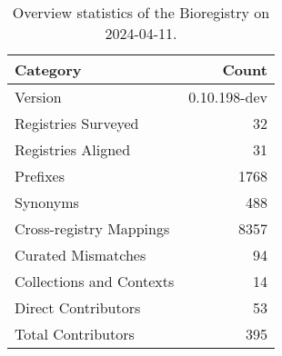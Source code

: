 \begin{table}
\caption{Overview statistics of the Bioregistry on 2024-04-11.}
\label{tab:bioregistry-summary}
\begin{tabular}{lr}
\toprule
Category & Count \\
\midrule
Version & 0.10.198-dev \\
Registries Surveyed & 32 \\
Registries Aligned & 31 \\
Prefixes & 1768 \\
Synonyms & 488 \\
Cross-registry Mappings & 8357 \\
Curated Mismatches & 94 \\
Collections and Contexts & 14 \\
Direct Contributors & 53 \\
Total Contributors & 395 \\
\bottomrule
\end{tabular}
\end{table}
